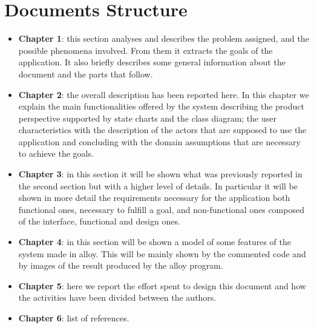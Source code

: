 \section{Documents Structure}

\begin{itemize}
    \item \textbf{Chapter 1}: this section analyses and describes the problem assigned, and the possible phenomena involved. From them it extracts the goals of the application. It also briefly describes some general information about the document and the parts that follow.
    \item \textbf{Chapter 2}: the overall description has been reported here. In this chapter we explain the main functionalities offered by the system describing the product perspective supported by state charts and the class diagram; the user characteristics with the description of the actors that are supposed to use the application and concluding with the domain assumptions that are necessary to achieve the goals.
    \item \textbf{Chapter 3}: in this section it will be shown what was previously reported in the second section but with a higher level of details. In particular it will be shown in more detail the requirements necessary for the application both functional ones, necessary to fulfill a goal, and non-functional ones composed of the interface, functional and design ones.
    \item \textbf{Chapter 4}: in this section will be shown a model of some features of the system made in alloy. This will be mainly shown by the commented code and by images of the result produced by the alloy program.
    \item \textbf{Chapter 5}: here we report the effort spent to design this document and how the activities have been divided between the authors.
    \item \textbf{Chapter 6}: list of references.
\end{itemize}